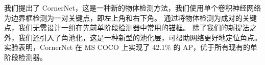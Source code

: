 \documentclass[../main]{subfile}
\begin{document}
我们提出了 CornerNet，这是一种新的物体检测方法，我们使用单个卷积神经网络为边界框检测为一对关键点，即左上角和右下角。 通过将物体检测为成对的关键点，我们无需设计一组在先前单阶段检测器中常用的锚框。 除了我们的新提法之外，我们还引入了角池化，这是一种新型的池化层，可帮助网络更好地定位角点。 实验表明，CornerNet 在 MS COCO 上实现了 42.1\% 的 AP，优于所有现有的单阶段检测器。
\end{document}
